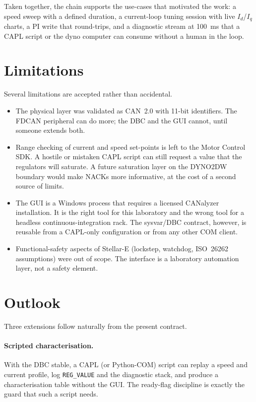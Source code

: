 Taken together, the chain supports the use-cases that motivated the
work: a speed sweep with a defined duration, a current-loop tuning
session with live $I_d$/$I_q$ charts, a PI write that round-trips, and
a diagnostic stream at \SI{100}{\milli\second} that a CAPL script or
the dyno computer can consume without a human in the loop.

\section{Limitations}
Several limitations are accepted rather than accidental.

\begin{itemize}[leftmargin=1.6em]
  \item The physical layer was validated as CAN~2.0 with 11-bit
        identifiers. The FDCAN peripheral can do more; the DBC and the
        GUI cannot, until someone extends both.
  \item Range checking of current and speed set-points is left to the
        Motor Control SDK. A hostile or mistaken CAPL script can still
        request a value that the regulators will saturate. A future
        saturation layer on the DYNO2DW boundary would make NACKs more
        informative, at the cost of a second source of limits.
  \item The GUI is a Windows process that requires a licensed CANalyzer
        installation. It is the right tool for this laboratory and the
        wrong tool for a headless continuous-integration rack. The
        sysvar/DBC contract, however, is reusable from a CAPL-only
        configuration or from any other COM client.
  \item Functional-safety aspects of Stellar-E (lockstep, watchdog,
        ISO~26262 assumptions) were out of scope. The interface is a
        laboratory automation layer, not a safety element.
\end{itemize}

\section{Outlook}
Three extensions follow naturally from the present contract.

\paragraph{Scripted characterisation.}
With the DBC stable, a CAPL (or Python-COM) script can replay a speed
and current profile, log \texttt{REG\_VALUE} and the diagnostic stack,
and produce a characterisation table without the GUI. The ready-flag
discipline is exactly the guard that such a script needs.

